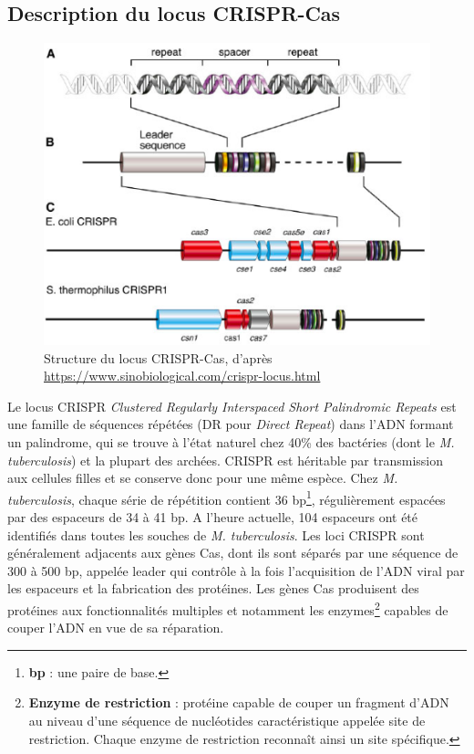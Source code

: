 \documentclass[twoside,a4paper,11pt,frenchb,openany]{report}
\begin{document}

\subsection{Description du locus CRISPR-Cas}

\begin{figure}[h!]
\centering
\includegraphics[scale=0.6]{crispr.png}
\caption{Structure du locus CRISPR-Cas, d'après\\ \url{https://www.sinobiological.com/crispr-locus.html}}
\end{figure}

Le locus CRISPR \textit{Clustered Regularly Interspaced Short Palindromic Repeats} est une famille de séquences répétées (DR pour \textit{Direct Repeat}) dans l'ADN formant un palindrome, qui se trouve à l'état naturel chez 40\% des bactéries (dont le \textit{M. tuberculosis}) et la plupart des archées. CRISPR est héritable par transmission aux cellules filles et se conserve donc pour une même espèce. Chez \textit{M. tuberculosis}, chaque série de répétition contient 36 bp\footnote{\textbf{bp} : une paire de base.}, régulièrement espacées par des espaceurs de 34 à 41 bp. A l'heure actuelle, 104 espaceurs ont été identifiés dans toutes les souches de \textit{M. tuberculosis}. Les loci CRISPR sont généralement adjacents aux gènes Cas, dont ils sont séparés par une séquence de 300 à 500 bp, appelée leader qui contrôle à la fois l'acquisition de l'ADN viral par les espaceurs et la fabrication des protéines. Les gènes Cas produisent des protéines aux fonctionnalités multiples et notamment les enzymes\footnote{\textbf{Enzyme de restriction} : protéine capable de couper un fragment d'ADN au niveau d'une séquence de nucléotides caractéristique appelée site de restriction. Chaque enzyme de restriction reconnaît ainsi un site spécifique.} capables de couper l'ADN en vue de sa réparation.
\end{document}
